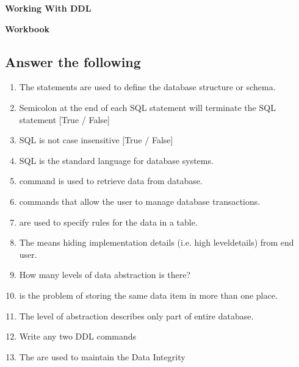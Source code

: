 \documentclass[11pt,a4paper]{article}
\begin{document}
\centerline{\huge{\textbf{Working With DDL}}}
\vspace{1pc}
\centerline{\Large{ \textbf{Workbook}}}
\subsection*{Answer the following}
\begin{enumerate}\itemsep10pt
\item The \underline{\hspace{3cm}} statements are used to define the database structure or schema.
\item Semicolon at the end of each SQL statement will terminate the SQL statement [True / False]
\item SQL is not case insensitive [True / False]
\item SQL is the standard language for \underline{\hspace{3cm}} database systems.
\item \underline{\hspace{3cm}} command is used to retrieve data from database.
\item \underline{\hspace{3cm}} commands that allow the user to manage database transactions.

\item \underline{\hspace{3cm}} are used to specify rules for the data in a table.
\item The \underline{\hspace{3cm}} means hiding implementation details (i.e. high leveldetails) from end user.
\item How many levels of data abstraction is there? \underline{\hspace{3cm}}
\item \underline{\hspace{3cm}} is the problem of storing the same data item in more than one place.
\item The \underline{\hspace{3cm}} level of abstraction describes only part of entire database.
\item Write any two DDL commands \underline{\hspace{3cm}}
\item The \underline{\hspace{3cm}} are used to maintain the Data Integrity
\end{enumerate}
\end{document}
